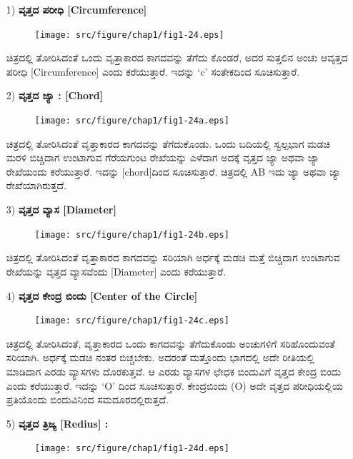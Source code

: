 \begin{enumerate}
\item[1)] \textbf{ವೃತ್ತದ ಪರೀಧಿ [Circumference]} 
\begin{figure}[H]
\centering
\texttt{[image: src/figure/chap1/fig1-24.eps]}
\end{figure}
 
 ಚಿತ್ರದಲ್ಲಿ ತೋರಿಸಿದಂತೆ ಒಂದು ವೃತ್ತಾಕಾರದ ಕಾಗದವನ್ನು ತೆಗೆದು ಕೊಂಡರೆ, ಅದರ ಸುತ್ತಲಿನ ಅಂಚು ಆವೃತ್ತದ ಪರೀಧಿ [Circumference] ಎಂದು ಕರೆಯುತ್ತಾರೆ. ಇದನ್ನು `c' ಸಂತೇಕದಿಂದ ಸೂಚಿಸುತ್ತಾರೆ. 
 
\item[2)] \textbf{ವೃತ್ತದ ಜ್ಯಾ : [Chord]}
\begin{figure}[H]
\centering
\texttt{[image: src/figure/chap1/fig1-24a.eps]}
\end{figure}
 
 ಚಿತ್ರದಲ್ಲಿ ತೋರಿಸಿದಂತೆ ವೃತ್ತಾಕಾರದ ಕಾಗದವನ್ನು ತೆಗೆದುಕೊಂಡು. ಒಂದು ಬದಿಯಲ್ಲಿ ಸ್ವಲ್ಪಭಾಗ ಮಡಚಿ ಮರಳಿ ಬಿಚ್ಚಿದಾಗ ಉಂಟಾಗುವ ಗೆರೆಯಗುಂಟ ರೇಖೆಯನ್ನು ಎಳೆದಾಗ ಅದಕ್ಕೆ ವೃತ್ತದ ಜ್ಯಾ ಅಥವಾ ಜ್ಯಾ ರೇಖೆಯಂದು ಕರೆಯುತ್ತಾರೆ. ಇದನ್ನು [chord]ದಿಂದ ಸೂಚಿಸುತ್ತಾರೆ. ಚಿತ್ರದಲ್ಲಿ AB ಇದು ಜ್ಯಾ ಅಥವಾ ಜ್ಯಾ ರೇಖೆಯಾಗಿರುತ್ತದೆ. 
 
\item[3)] \textbf{ವೃತ್ತದ ವ್ಯಾಸ [Diameter]}
\begin{figure}[H]
\centering
\texttt{[image: src/figure/chap1/fig1-24b.eps]}
\end{figure} 

 ಚಿತ್ರದಲ್ಲಿ ತೋರಿಸಿದಂತೆ ವೃತ್ತಾಕಾರದ ಕಾಗದವನ್ನು ಸರಿಯಾಗಿ ಅರ್ಧಕ್ಕೆ ಮಡಚಿ ಮತ್ತೆ ಬಿಚ್ಚಿದಾಗ ಉಂಟಾಗುವ ರೇಖೆಯನ್ನು ವೃತ್ತದ ವ್ಯಾಸವೆಂದು [Diameter] ಎಂದು ಕರೆಯುತ್ತಾರೆ. 

\item[4)] \textbf{ವೃತ್ತದ ಕೇಂದ್ರ ಬಿಂದು [Center of the Circle]}
\begin{figure}[H]
\centering
\texttt{[image: src/figure/chap1/fig1-24c.eps]}
\end{figure}
 
 ಚಿತ್ರದಲ್ಲಿ ತೋರಿಸಿದಂತೆ, ವೃತ್ತಾಕಾರದ ಒಂದು ಕಾಗದವನ್ನು ತೆಗೆದುಕೊಂಡು ಅಂಚುಗಳಿಗೆ ಸರಿಹೊಂದುವಂತೆ ಸರಿಯಾಗಿ. ಅರ್ಧಕ್ಕೆ ಮಡಚಿ ನಂತರ ಬಿಚ್ಚಬೇಕು. ಅದರಂತೆ ಮತ್ತೊಂದು ಭಾಗದಲ್ಲಿ ಅದೇ ರೀತಿಯಲ್ಲಿ ಮಾಡಿದಾಗ ಎರಡು ವ್ಯಾಸಗಳು ದೊರಕುತ್ತವೆ. ಆ ಎರಡು ವ್ಯಾಸಗಳ ಛೇಧಕ ಬಿಂದುವಿಗೆ ವೃತ್ತದ ಕೇಂದ್ರ ಬಿಂದು ಎಂದು ಕರೆಯುತ್ತಾರೆ. ಇದನ್ನು `O' ದಿಂದ ಸೂಚಿಸುತ್ತಾರೆ. ಕೇಂದ್ರಬಿಂದು (O) ಅದೇ ವೃತ್ತದ ಪರೀಧಿಯಲ್ಲಿಯ ಪ್ರತಿಯೊಂದು ಬಿಂದುವಿನಿಂದ ಸಮದೂರದಲ್ಲಿರುತ್ತದೆ. 
 
\eject
 
\item[5)] \textbf{ವೃತ್ತದ ತ್ರಿಜ್ಯ [Redius] :}
\begin{figure}[H]
\centering
\texttt{[image: src/figure/chap1/fig1-24d.eps]}
\end{figure}
	

\end{enumerate}
